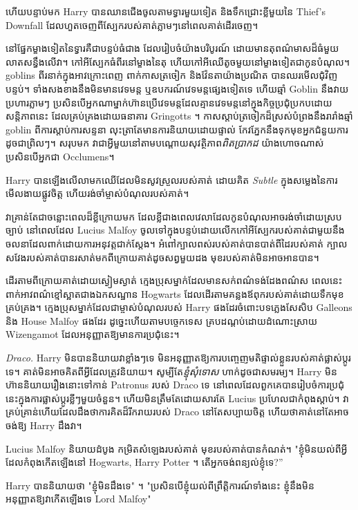 ហើយបន្ទាប់មក Harry បានឈានជើងចូលតាមទ្វារមួយទៀត និងទឹកជ្រោះខ្លីមួយនៃ Thief's Downfall ដែលហួតចេញពីស្បែករបស់គាត់ភ្លាមៗនៅពេលគាត់ដើរចេញ។

នៅផ្នែកម្ខាងទៀតនៃទ្វារគឺជាបន្ទប់ធំជាង ដែលរៀបចំយ៉ាងបរិបូរណ៍ ដោយមានតុពណ៌មាសដ៏ធំមួយលាតសន្ធឹងលើវា។ កៅអី​ស្បែក​ធំ​ពីរ​នៅ​ម្ខាង​នៃ​តុ ហើយ​កៅអី​ឈើ​តូច​មួយ​នៅ​ម្ខាង​ទៀត​ជា​កូន​បំណុល។ goblins ពីរ​នាក់​ក្នុង​អាវក្រោះ​ពេញ ពាក់​កាស​ត្រចៀក និង​វ៉ែនតា​យ៉ាង​ប្រណិត បាន​ឈរ​មើល​ជុំវិញ​បន្ទប់។ ទាំងសងខាងនឹងមិនមានវេទមន្ត ឬឧបករណ៍វេទមន្តផ្សេងទៀតទេ ហើយឆ្មាំ Goblin នឹងវាយប្រហារភ្លាមៗ ប្រសិនបើអ្នកណាម្នាក់ហ៊ានប្រើវេទមន្តដែលគ្មានវេទមន្តនៅក្នុងកិច្ចប្រជុំប្រកបដោយសន្តិភាពនេះ ដែលគ្រប់គ្រងដោយធនាគារ Gringotts ។ កាសស្តាប់ត្រចៀកដ៏ស្រស់បំព្រងនឹងរារាំងឆ្មាំ goblin ពីការស្តាប់ការសន្ទនា លុះត្រាតែមានការនិយាយដោយផ្ទាល់ កែវភ្នែកនឹងទុកមុខអ្នកជំនួយការដូចជាព្រិលៗ។ សរុបមក វាជាអ្វីមួយនៅតាមបណ្តោយសុវត្ថិភាព\emph{ពិតប្រាកដ} យ៉ាងហោចណាស់ប្រសិនបើអ្នកជា Occlumens។

Harry បានឡើងលើលាមកឈើដែលមិនសូវស្រួលរបស់គាត់ ដោយគិត \emph{Subtle} ក្នុងសម្លេងនៃការមើលងាយផ្លូវចិត្ត ហើយរង់ចាំម្ចាស់បំណុលរបស់គាត់។

វាគ្រាន់តែជាចន្លោះពេលដ៏ខ្លីក្រោយមក ដែលខ្លីជាងពេលវេលាដែលកូនបំណុលអាចរង់ចាំដោយស្របច្បាប់ នៅពេលដែល Lucius Malfoy ចូលទៅក្នុងបន្ទប់ដោយលើកកៅអីស្បែករបស់គាត់ជាមួយនឹងចលនាដែលពាក់ដោយការអនុវត្តជាក់ស្តែង។ អំពៅ​ក្បាល​ពស់​របស់គាត់​បាន​បាត់​ពី​ដៃ​របស់គាត់ ក្បាល​ស​វែង​របស់គាត់​បាន​រសាត់​មក​ពីក្រោយ​គាត់​ដូច​សព្វមួយដង មុខ​របស់គាត់​មិនអាច​អាន​បាន​។

ដើរតាមពីក្រោយគាត់ដោយស្ងៀមស្ងាត់ ក្មេងប្រុសម្នាក់ដែលមានសក់ពណ៌ទង់ដែងពណ៌ស ពេលនេះពាក់អាវពណ៌ខ្មៅស្អាតជាងឯកសណ្ឋាន Hogwarts ដែលដើរតាមគន្លងឪពុករបស់គាត់ដោយទឹកមុខគ្រប់គ្រង។ ក្មេងប្រុសម្នាក់ដែលជាម្ចាស់បំណុលរបស់ Harry ផងដែរចំពោះបទភ្លេងសែសិប Galleons និង House Malfoy ផងដែរ ដូច្នេះហើយតាមបច្ចេកទេស គ្របដណ្តប់ដោយដំណោះស្រាយ Wizengamot ដែលអនុញ្ញាតឱ្យមានការប្រជុំនេះ។

\emph{Draco.} Harry មិនបាននិយាយវាខ្លាំងៗទេ មិនអនុញ្ញាតឱ្យការបញ្ចេញមតិផ្ទាល់ខ្លួនរបស់គាត់ផ្លាស់ប្តូរទេ។ គាត់មិនអាចគិតពីអ្វីដែលត្រូវនិយាយ។ សូម្បីតែ\emph{ខ្ញុំសុំទោស} ហាក់ដូចជាសមរម្យ។ Harry មិន​ហ៊ាន​និយាយ​រឿង​នោះ​ទៅ​កាន់ Patronus របស់ Draco ទេ នៅ​ពេល​ដែល​ពួក​គេ​បាន​រៀបចំ​ការ​ប្រជុំ​នេះ​ក្នុង​ការ​ផ្លាស់​ប្តូរ​ខ្លីៗ​មួយ​ចំនួន។ ហើយមិនត្រឹមតែដោយសារតែ Lucius ប្រហែលជាកំពុងស្តាប់។ វាគ្រប់គ្រាន់ហើយដែលដឹងថាការគិតដ៏រីករាយរបស់ Draco នៅតែសប្បាយចិត្ត ហើយថាគាត់នៅតែអាចចង់ឱ្យ Harry ដឹងវា។

Lucius Malfoy និយាយដំបូង កម្រិតសំឡេងរបស់គាត់ មុខរបស់គាត់បានកំណត់។ "ខ្ញុំមិនយល់ពីអ្វីដែលកំពុងកើតឡើងនៅ Hogwarts, Harry Potter ។ តើអ្នកចង់ពន្យល់ខ្ញុំទេ?”

Harry បាននិយាយថា "ខ្ញុំមិនដឹងទេ" ។ "ប្រសិនបើខ្ញុំយល់ពីព្រឹត្តិការណ៍ទាំងនេះ ខ្ញុំនឹងមិនអនុញ្ញាតឱ្យវាកើតឡើងទេ Lord Malfoy"

